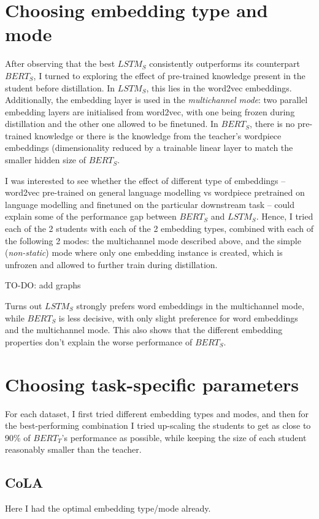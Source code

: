 \documentclass[bsc,frontabs,twoside,singlespacing,parskip,deptreport]{infthesis}
\begin{document}
{  \section{Choosing embedding type and mode}{
    After observing that the best $LSTM_S$ consistently outperforms its counterpart $BERT_S$, I turned to exploring the effect of pre-trained knowledge present in the student before distillation.
    In $LSTM_S$, this lies in the word2vec embeddings. Additionally, the embedding layer is used in the \textit{multichannel mode}: two parallel embedding layers are initialised from word2vec, with one being frozen during distillation and the other one allowed to be finetuned. In $BERT_S$, there is no pre-trained knowledge or there is the knowledge from the teacher's wordpiece embeddings (dimensionality reduced by a trainable linear layer to match the smaller hidden size of $BERT_S$.

    I was interested to see whether the effect of different type of embeddings -- word2vec pre-trained on general language modelling vs wordpiece pretrained on language modelling and finetuned on the particular downstream task -- could explain some of the performance gap between $BERT_S$ and $LSTM_S$.
    Hence, I tried each of the 2 students with each of the 2 embedding types, combined with each of the following 2 modes: the multichannel mode described above, and the simple (\textit{non-static}) mode where only one embedding instance is created, which is unfrozen and allowed to further train during distillation.

    TO-DO: add graphs

    Turns out $LSTM_S$ strongly prefers word embeddings in the multichannel mode, while $BERT_S$ is less decisive, with only slight preference for word embeddings and the multichannel mode. This also shows that the different embedding properties don't explain the worse performance of $BERT_S$.
  }

  \section{Choosing task-specific parameters}{
    For each dataset, I first tried different embedding types and modes, and then for the best-performing combination I tried up-scaling the students to get as close to 90\% of $BERT_T$'s performance as possible, while keeping the size of each student reasonably smaller than the teacher.

    \subsection{CoLA}{
      Here I had the optimal embedding type/mode already.

}}}
\end{document}
